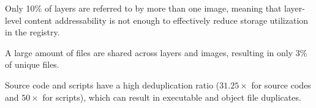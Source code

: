 \begin{compactitemize}
%
\item Only 10\% of layers are referred to by more than one image, 
meaning that layer-level content addressability is not enough to
effectively reduce storage utilization in the registry.
%
\item A large amount of files are shared across layers and images,
resulting in only 3\% of unique files.
%

\item Source code and scripts have a high deduplication ratio
(\textbf{$31.25\times$} for source codes and \textbf{$50\times$} for scripts),
which can result in executable and object file duplicates.

\end{compactitemize}

